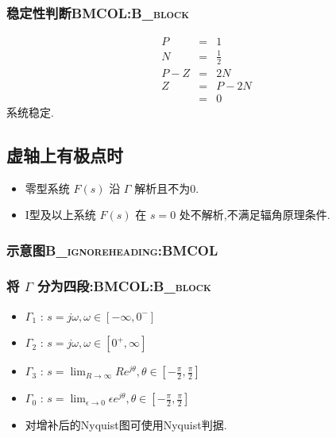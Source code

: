 \documentclass[table]{article}
\begin{document}
\subsubsection[稳定性判断]{稳定性判断\hfill{}\textsc{BMCOL:B\_block}}
\label{sec:orgcaf72e2}
\begin{eqnarray*}
P & = & 1\\
N &=& \frac{1}{2} \\
P-Z &=& 2N \\
Z &=& P-2N \\
  &=&0 
\end{eqnarray*}
系统稳定.

\subsection{虚轴上有极点时}
\label{sec:org91d5ddd}
\begin{itemize}
\item 零型系统 \(F(s)\) 沿 \(\Gamma\) 解析且不为0.
\item I型及以上系统 \(F(s)\) 在 \(s=0\) 处不解析,不满足辐角原理条件.
\end{itemize}

\subsubsection[示意图]{示意图\hfill{}\textsc{B\_ignoreheading:BMCOL}}
\label{sec:org0ba107e}

\subsubsection[将 \(\Gamma\) 分为四段:]{将 \(\Gamma\) 分为四段:\hfill{}\textsc{BMCOL:B\_block}}
\label{sec:org823a2e7}
\begin{itemize}
\item \(\Gamma_1\) : \(s=j\omega,\omega\in[-\infty,0^-]\)
\item \(\Gamma_2\) : \(s=j\omega,\omega\in[0^+,\infty]\)
\item \(\Gamma_3\) : \(s=\lim_{R\rightarrow\infty}Re^{j\theta},\theta\in[-\frac{\pi}{2},\frac{\pi}{2}]\)
\item \(\Gamma_0\) : \(s=\lim_{\epsilon\rightarrow 0}\epsilon e^{j\theta},\theta\in[-\frac{\pi}{2},\frac{\pi}{2}]\)
\item <3->对增补后的Nyquist图可使用Nyquist判据.
\end{itemize}
\end{document}
